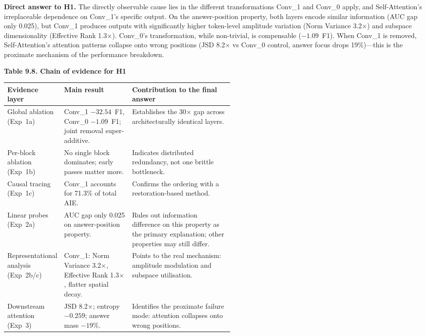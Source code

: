 \documentclass[10pt]{article}
\begin{document}
\textbf{Direct answer to H1.} The directly observable cause lies in the different transformations Conv\_1 and Conv\_0 apply, and Self-Attention's irreplaceable dependence on Conv\_1's specific output. On the answer-position property, both layers encode similar information (AUC gap only 0.025), but Conv\_1 produces outputs with significantly higher token-level amplitude variation (Norm Variance 3.2$\times$) and subspace dimensionality (Effective Rank 1.3$\times$). Conv\_0's transformation, while non-trivial, is compensable ($-1.09$~F1). When Conv\_1 is removed, Self-Attention's attention patterns collapse onto wrong positions (JSD 8.2$\times$ vs Conv\_0 control, answer focus drops 19\%)---this is the proximate mechanism of the performance breakdown.

\small
\begin{center}
{\bfseries Table 9.8. Chain of evidence for H1}\\[0.25em]
\begin{tabularx}{0.96\linewidth}{>{\raggedright\arraybackslash}p{0.24\linewidth}>{\raggedright\arraybackslash}p{0.30\linewidth}>{\raggedright\arraybackslash}X}
\toprule
\textbf{Evidence layer} & \textbf{Main result} & \textbf{Contribution to the final answer}\\
\midrule
Global ablation (Exp~1a) & Conv\_1 $-32.54$~F1, Conv\_0 $-1.09$~F1; joint removal super-additive. & Establishes the 30$\times$ gap across architecturally identical layers.\\
Per-block ablation (Exp~1b) & No single block dominates; early passes matter more. & Indicates distributed redundancy, not one brittle bottleneck.\\
Causal tracing (Exp~1c) & Conv\_1 accounts for 71.3\% of total AIE. & Confirms the ordering with a restoration-based method.\\
Linear probes (Exp~2a) & AUC gap only 0.025 on answer-position property. & Rules out information difference on this property as the primary explanation; other properties may still differ.\\
Representational analysis (Exp~2b/c) & Conv\_1: Norm Variance 3.2$\times$, Effective Rank 1.3$\times$, flatter spatial decay. & Points to the real mechanism: amplitude modulation and subspace utilisation.\\
Downstream attention (Exp~3) & JSD 8.2$\times$; entropy $-0.259$; answer mass $-19\%$. & Identifies the proximate failure mode: attention collapses onto wrong positions.\\
\bottomrule
\end{tabularx}
\end{center}
\normalsize
\end{document}
